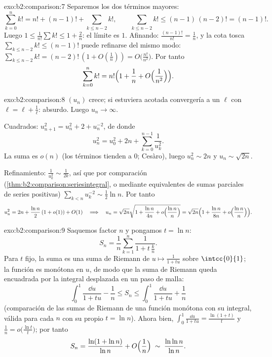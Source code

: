 \begin{solution}{exo:b2:comparison:7}
Separemos los dos términos mayores:
\[
\sum_{k=0}^{n} k! = n! + (n-1)! + \sum_{k \leq n-2} k! ,
\qquad
\sum_{k\leq n-2} k! \leq (n-1)\,(n-2)! = (n-1)! .
\]
Luego $1 \leq \frac{1}{n!}\sum k! \leq 1 + \frac{2}{n}$: el límite
es $1$. Afinando: $\frac{(n-1)!}{n!} = \frac1n$, y la cota tosca
$\sum_{k \leq n-2}k! \leq (n-1)!$ puede refinarse del mismo modo:
$\sum_{k\leq n-2} k! = (n-2)!\,(1 + O(\frac1n)) =
O\bigl(\frac{n!}{n^2}\bigr)$. Por tanto
\[
\sum_{k=0}^{n} k! = n!\Bigl(1 + \frac1n + O\Bigl(\frac{1}{n^2}\Bigr)\Bigr).
\]
\end{solution}

\begin{solution}{exo:b2:comparison:8}
$(u_n)$ crece; si estuviera acotada convergería a un $\ell$ con
$\ell = \ell + \frac1\ell$: absurdo. Luego $u_n \to \infty$.

Cuadrados: $u_{n+1}^2 = u_n^2 + 2 + u_n^{-2}$, de donde
\[
u_n^2 = u_0^2 + 2n + \sum_{k=0}^{n-1} \frac{1}{u_k^2} .
\]
La suma es $o(n)$ (los términos tienden a $0$; Cesàro), luego $u_n^2
\sim 2n$ y $u_n \sim \sqrt{2n}$.

Refinamiento: $\frac{1}{u_k^2} \sim \frac{1}{2k}$, así que por
comparación (\cref{thm:b2:comparison:seriesintegral}, o mediante
equivalentes de sumas parciales de series positivas) $\sum_{k<n}
u_k^{-2} \sim \frac12 \ln n$. Por tanto
\[
u_n^2 = 2n + \frac{\ln n}{2}\,(1 + o(1)) + O(1)
\quad\Longrightarrow\quad
u_n = \sqrt{2n}\sqrt{1 + \frac{\ln n}{4n} + o\Bigl(\frac{\ln
n}{n}\Bigr)}
= \sqrt{2n}\Bigl(1 + \frac{\ln n}{8n} + o\Bigl(\frac{\ln
n}{n}\Bigr)\Bigr).
\]
\end{solution}

\begin{solution}{exo:b2:comparison:9}
Saquemos factor $n$ y pongamos $t = \ln n$:
\[
S_n = \frac1n \sum_{k=1}^{n} \frac{1}{1 + t\,\frac kn} .
\]
Para $t$ fijo, la suma es una suma de Riemann de $u \mapsto
\frac{1}{1 + tu}$ sobre $\intcc{0}{1}$; la función es monótona en
$u$, de modo que la suma de Riemann queda encuadrada por la integral
desplazada en un paso de malla:
\[
\int_0^1 \frac{\dd u}{1 + tu} - \frac1n
\leq S_n \leq \int_0^1 \frac{\dd u}{1 + tu} + \frac1n
\]
(comparación de las sumas de Riemann de una función monótona con su
integral, válida para cada $n$ con su propio $t = \ln n$). Ahora
bien, $\int_0^1 \frac{\dd u}{1 + tu} = \frac{\ln(1 + t)}{t}$ y
$\frac1n = o\bigl(\frac{\ln t}{t}\bigr)$; por tanto
\[
S_n = \frac{\ln(1 + \ln n)}{\ln n} + O\Bigl(\frac 1n\Bigr)
\;\sim\; \frac{\ln\ln n}{\ln n} .
\]
\end{solution}

